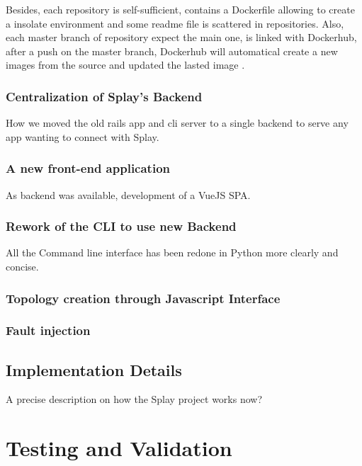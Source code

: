 \documentclass{eplmastersthesis}
\begin{document}
        Besides, each repository is self-sufficient, contains a Dockerfile allowing to create a 
        insolate environment and some readme file is scattered in repositories. 
        Also, each master branch of repository expect the main one, is linked with 
        Dockerhub, after a push on the master branch, Dockerhub will automatical create a new images from
        the source and updated the lasted image \cite{DockerHubGithub}. 

      \subsection{Centralization of Splay's Backend}

        How we moved the old rails app and cli server to a single backend
        to serve any app wanting to connect with Splay.

      \subsection{A new front-end application}

        As backend was available, development of a VueJS SPA.

      \subsection{Rework of the CLI to use new Backend}

        All the Command line interface has been redone in Python more clearly and concise.

      \subsection{Topology creation through Javascript Interface}

      \subsection{Fault injection}

    \section{Implementation Details}

      A precise description on how the Splay project works now?


  \chapter{Testing and Validation}
\end{document}
